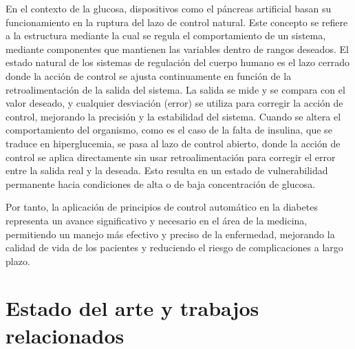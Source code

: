 En el contexto de la glucosa, dispositivos como el páncreas artificial basan su funcionamiento en la ruptura del lazo de control natural. Este concepto se refiere a la estructura mediante la cual se regula el comportamiento de un sistema, mediante componentes que mantienen las variables dentro de rangos deseados. El estado natural de los sistemas de regulación del cuerpo humano es el lazo cerrado donde la acción de control se ajusta continuamente en función de la retroalimentación de la salida del sistema. La salida se mide y se compara con el valor deseado, y cualquier desviación (error) se utiliza para corregir la acción de control, mejorando la precisión y la estabilidad del sistema. Cuando se altera el comportamiento del organismo, como es el caso de la falta de insulina, que se traduce en hiperglucemia, se pasa al lazo de control abierto, donde la acción de control se aplica directamente sin usar retroalimentación para corregir el error entre la salida real y la deseada. Esto resulta en un estado de vulnerabilidad permanente hacia condiciones de alta o de baja concentración de glucosa.

Por tanto, la aplicación de principios de control automático en la diabetes representa un avance significativo y necesario en el área de la medicina, permitiendo un manejo más efectivo y preciso de la enfermedad, mejorando la calidad de vida de los pacientes y reduciendo el riesgo de complicaciones a largo plazo.

\clearpage
\section{Estado del arte y trabajos relacionados}

